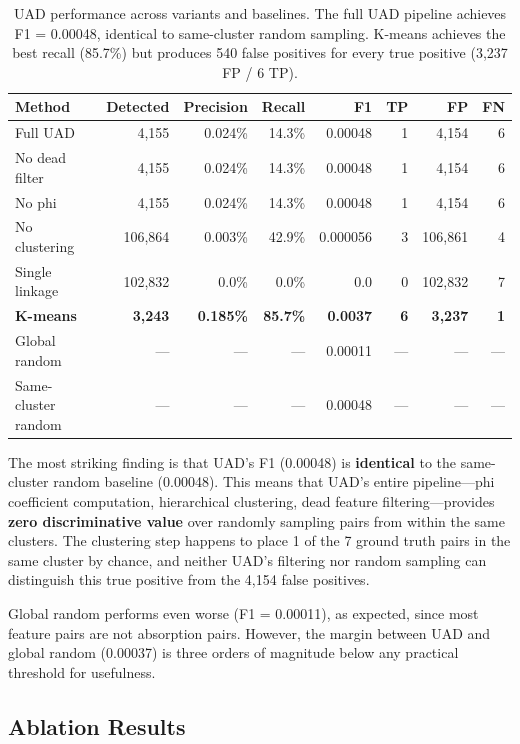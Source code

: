 \documentclass{article}
\begin{document}
\begin{table}[t]
\caption{UAD performance across variants and baselines. The full UAD pipeline achieves F1 = 0.00048, identical to same-cluster random sampling. K-means achieves the best recall (85.7\%) but produces 540 false positives for every true positive (3,237 FP / 6 TP).}
\label{tab:uad_performance}
\centering
\small
\begin{tabular}{lrrrrrrr}
\toprule
Method & Detected & Precision & Recall & F1 & TP & FP & FN \\
\midrule
Full UAD & 4,155 & 0.024\% & 14.3\% & 0.00048 & 1 & 4,154 & 6 \\
No dead filter & 4,155 & 0.024\% & 14.3\% & 0.00048 & 1 & 4,154 & 6 \\
No phi & 4,155 & 0.024\% & 14.3\% & 0.00048 & 1 & 4,154 & 6 \\
No clustering & 106,864 & 0.003\% & 42.9\% & 0.000056 & 3 & 106,861 & 4 \\
Single linkage & 102,832 & 0.0\% & 0.0\% & 0.0 & 0 & 102,832 & 7 \\
\textbf{K-means} & \textbf{3,243} & \textbf{0.185\%} & \textbf{85.7\%} & \textbf{0.0037} & \textbf{6} & \textbf{3,237} & \textbf{1} \\
Global random & --- & --- & --- & 0.00011 & --- & --- & --- \\
Same-cluster random & --- & --- & --- & 0.00048 & --- & --- & --- \\
\bottomrule
\end{tabular}
\end{table}

The most striking finding is that UAD's F1 (0.00048) is \textbf{identical} to the same-cluster random baseline (0.00048). This means that UAD's entire pipeline---phi coefficient computation, hierarchical clustering, dead feature filtering---provides \textbf{zero discriminative value} over randomly sampling pairs from within the same clusters. The clustering step happens to place 1 of the 7 ground truth pairs in the same cluster by chance, and neither UAD's filtering nor random sampling can distinguish this true positive from the 4,154 false positives.

Global random performs even worse (F1 = 0.00011), as expected, since most feature pairs are not absorption pairs. However, the margin between UAD and global random (0.00037) is three orders of magnitude below any practical threshold for usefulness.

\subsection{Ablation Results}
\end{document}
